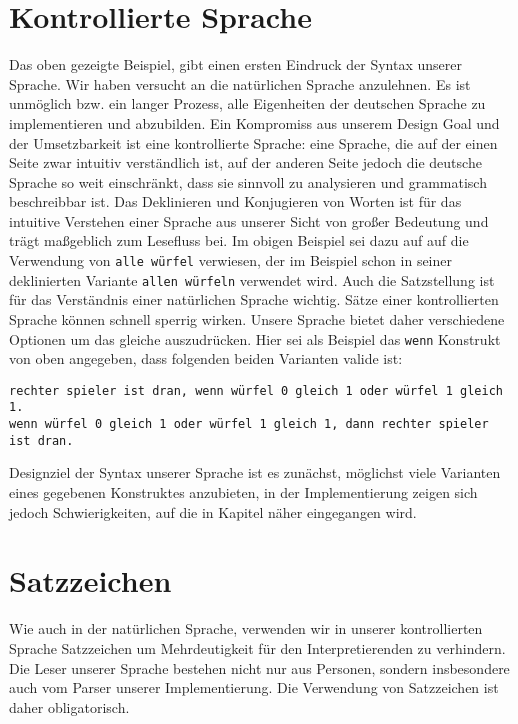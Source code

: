	\section{Kontrollierte Sprache}
	\label{sec:kontrollierte_sprache}
		Das oben gezeigte Beispiel, gibt einen ersten Eindruck der Syntax unserer Sprache. 
        Wir haben versucht \dg an die natürlichen Sprache anzulehnen. Es ist unmöglich bzw. ein langer Prozess, alle Eigenheiten der deutschen Sprache zu implementieren und abzubilden. Ein Kompromiss aus unserem Design Goal und der Umsetzbarkeit ist eine kontrollierte Sprache: eine Sprache, die auf der einen Seite zwar intuitiv verständlich ist, auf der anderen Seite jedoch die deutsche Sprache so weit einschränkt, dass sie sinnvoll zu analysieren und grammatisch beschreibbar ist. 
        Das Deklinieren und Konjugieren von Worten ist für das intuitive Verstehen einer Sprache aus unserer Sicht von großer Bedeutung und trägt maßgeblich zum Lesefluss bei. Im obigen Beispiel sei dazu auf auf die Verwendung von \texttt{alle würfel} verwiesen, der im Beispiel schon in seiner deklinierten Variante \texttt{allen würfeln} verwendet wird.
        Auch die Satzstellung ist für das Verständnis einer natürlichen Sprache wichtig. Sätze einer kontrollierten Sprache können schnell sperrig wirken. Unsere Sprache bietet daher verschiedene Optionen um das gleiche auszudrücken. Hier sei als Beispiel das \texttt{wenn} Konstrukt von oben angegeben, dass folgenden beiden Varianten valide ist:
\begin{lstlisting}
rechter spieler ist dran, wenn würfel 0 gleich 1 oder würfel 1 gleich 1.
wenn würfel 0 gleich 1 oder würfel 1 gleich 1, dann rechter spieler ist dran.
\end{lstlisting}
        Designziel der Syntax unserer Sprache ist es zunächst, möglichst viele Varianten eines gegebenen Konstruktes anzubieten, in der Implementierung zeigen sich jedoch Schwierigkeiten, auf die in Kapitel  näher eingegangen wird.
        
    \section{Satzzeichen} %
    \label{sec:satzzeichen}
        Wie auch in der natürlichen Sprache, verwenden wir in unserer kontrollierten Sprache Satzzeichen um Mehrdeutigkeit für den Interpretierenden zu verhindern. Die Leser unserer Sprache bestehen nicht nur aus Personen, sondern insbesondere auch vom Parser unserer Implementierung. Die Verwendung von Satzzeichen ist daher obligatorisch.
